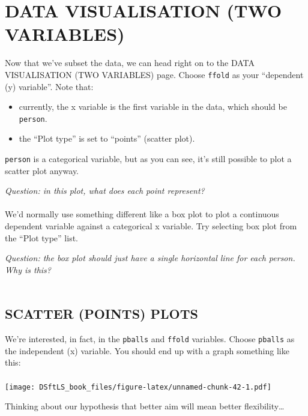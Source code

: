 \documentclass[
]{book}
\providecommand{\tightlist}{%
  \setlength{\itemsep}{0pt}\setlength{\parskip}{0pt}}
\begin{document}
\hypertarget{data-visualisation-two-variables}{%
\section{DATA VISUALISATION (TWO VARIABLES)}\label{data-visualisation-two-variables}}

Now that we've subset the data, we can head right on to the DATA VISUALISATION
(TWO VARIABLES) page. Choose \texttt{ffold} as your ``dependent (y) variable''. Note that:

\begin{itemize}
\tightlist
\item
  currently, the x variable is the first variable in the data, which should be
  \texttt{person}.
\item
  the ``Plot type'' is set to ``points'' (scatter plot).
\end{itemize}

\texttt{person} is a categorical variable, but as you can see, it's still possible to
plot a scatter plot anyway.

\emph{Question: in this plot, what does each point represent?}\\
~\\

We'd normally use something different like a box plot to plot a continuous
dependent variable against a categorical x variable. Try selecting box plot from
the ``Plot type'' list.

\emph{Question: the box plot should just have a single horizontal line for each
person. Why is this?}\\
~\\

\hypertarget{scatter-points-plots}{%
\subsection{SCATTER (POINTS) PLOTS}\label{scatter-points-plots}}

We're interested, in fact, in the \texttt{pballs} and \texttt{ffold} variables. Choose
\texttt{pballs} as the independent (x) variable. You should end up with a graph something
like this:\\
~\\

\texttt{[image: DSftLS\_book\_files/figure-latex/unnamed-chunk-42-1.pdf]}

Thinking about our hypothesis that
better aim will mean better flexibility\ldots{}
\end{document}
